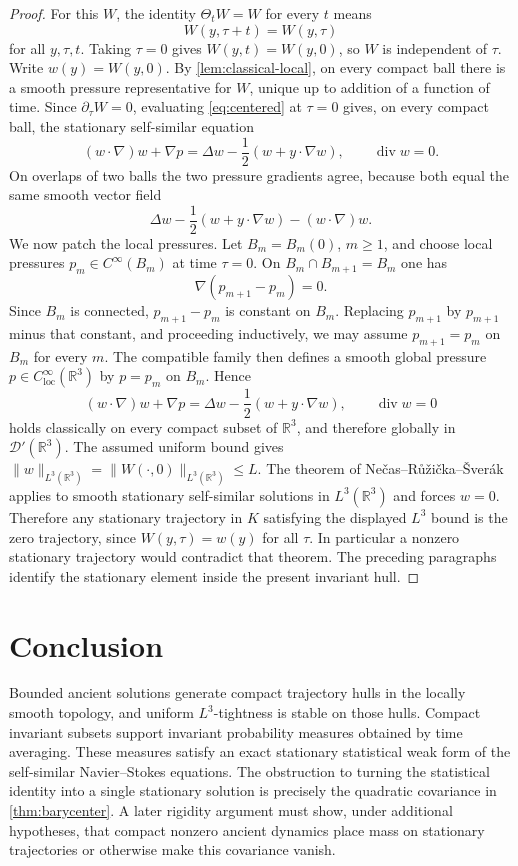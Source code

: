 \documentclass[11pt]{amsart}
\theoremstyle{plain}
\theoremstyle{definition}
\theoremstyle{remark}
\numberwithin{equation}{section}
\begin{document}
\begin{proof}
For this \(W\), the identity \(\Theta_tW=W\) for every \(t\) means
\[
   W(y,\tau+t)=W(y,\tau)
\]
for all \(y,\tau,t\).  Taking \(\tau=0\) gives
\(W(y,t)=W(y,0)\), so \(W\) is independent of \(\tau\).  Write
\(w(y)=W(y,0)\).  By \cref{lem:classical-local}, on every compact ball there
is a smooth pressure representative for \(W\), unique up to addition of a
function of time.  Since \(\partial_\tau W=0\), evaluating
\eqref{eq:centered} at \(\tau=0\) gives, on every compact ball, the
stationary self-similar equation
\[
   (w\cdot\nabla)w+\nabla p
   =
   \Delta w-\frac12(w+y\cdot\nabla w),
   \qquad \operatorname{div}w=0 .
\]
On overlaps of two balls the two pressure gradients agree, because both equal
the same smooth vector field
\[
   \Delta w-\frac12(w+y\cdot\nabla w)-(w\cdot\nabla)w .
\]
We now patch the local pressures.  Let \(B_m=B_m(0)\), \(m\ge1\), and choose
local pressures \(p_m\in C^\infty(B_m)\) at time \(\tau=0\).  On
\(B_m\cap B_{m+1}=B_m\) one has
\[
   \nabla(p_{m+1}-p_m)=0 .
\]
Since \(B_m\) is connected, \(p_{m+1}-p_m\) is constant on \(B_m\).  Replacing
\(p_{m+1}\) by \(p_{m+1}\) minus that constant, and proceeding inductively,
we may assume \(p_{m+1}=p_m\) on \(B_m\) for every \(m\).  The compatible
family then defines a smooth global pressure \(p\in C^\infty_{\mathrm{loc}}
(\mathbb R^3)\) by \(p=p_m\) on \(B_m\).  Hence
\[
   (w\cdot\nabla)w+\nabla p
   =
   \Delta w-\frac12(w+y\cdot\nabla w),
   \qquad \operatorname{div}w=0
\]
holds classically on every compact subset of \(\mathbb R^3\), and therefore
globally in \(\mathcal D'(\mathbb R^3)\).
The assumed uniform bound gives
\(\|w\|_{L^3(\mathbb R^3)}
=\|W(\cdot,0)\|_{L^3(\mathbb R^3)}\le L\).  The theorem of
Ne\v{c}as--R\r{u}\v{z}i\v{c}ka--\v{S}ver\'ak \cite{NRS1996} applies to smooth stationary
self-similar solutions in \(L^3(\mathbb R^3)\) and forces \(w=0\).  Therefore
any stationary trajectory in \(K\) satisfying the displayed \(L^3\) bound is
the zero trajectory, since \(W(y,\tau)=w(y)\) for all \(\tau\).  In particular
a nonzero stationary trajectory would contradict that theorem.  The preceding
paragraphs identify the stationary element inside the present invariant hull.
\end{proof}

\section{Conclusion}

Bounded ancient solutions generate compact trajectory hulls in the locally
smooth topology, and uniform \(L^3\)-tightness is stable on those hulls.
Compact invariant subsets support invariant probability measures obtained by
time averaging.  These measures satisfy an exact stationary statistical weak
form of the self-similar Navier--Stokes equations.  The obstruction to turning
the statistical identity into a single stationary solution is precisely the
quadratic covariance in \cref{thm:barycenter}.  A later rigidity argument must
show, under additional hypotheses, that compact nonzero ancient dynamics place
mass on stationary trajectories or otherwise make this covariance vanish.
\end{document}
